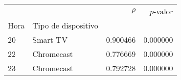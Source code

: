 \begin{tabular}{llrr}
\toprule
 &  & $\rho$ & $p$-valor \\
Hora & Tipo de dispositivo &  &  \\
\midrule
20 & Smart TV & 0.900466 & 0.000000 \\
\cline{1-4}
22 & Chromecast & 0.776669 & 0.000000 \\
\cline{1-4}
23 & Chromecast & 0.792728 & 0.000000 \\
\cline{1-4}
\bottomrule
\end{tabular}
